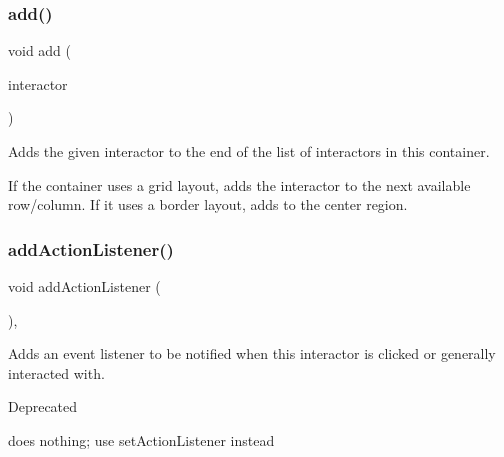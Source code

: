 \subsubsection{\texorpdfstring{add()}{add()}\hspace{0.1cm}{\footnotesize\ttfamily [2/2]}}
{\footnotesize\ttfamily void add (\begin{DoxyParamCaption}\item[{\mbox{\hyperlink{classGInteractor}{G\+Interactor}} \&}]{interactor }\end{DoxyParamCaption})\hspace{0.3cm}{\ttfamily [virtual]}}



Adds the given interactor to the end of the list of interactors in this container. 

If the container uses a grid layout, adds the interactor to the next available row/column. If it uses a border layout, adds to the center region. \mbox{\label{classGInteractor_a02f20ea6edfa0671f31c4c648a253833}} 
\subsubsection{\texorpdfstring{add\+Action\+Listener()}{addActionListener()}}
{\footnotesize\ttfamily void add\+Action\+Listener (\begin{DoxyParamCaption}{ }\end{DoxyParamCaption})\hspace{0.3cm}{\ttfamily [virtual]}, {\ttfamily [inherited]}}



Adds an event listener to be notified when this interactor is clicked or generally interacted with. 

\begin{DoxyRefDesc}{Deprecated}
\item[\mbox{\hyperlink{deprecated__deprecated000006}{Deprecated}}]does nothing; use set\+Action\+Listener instead \end{DoxyRefDesc}
\mbox{\label{classGContainer_adf2c09cdcbf0f38c03d75a250fd8ce5d}} 
